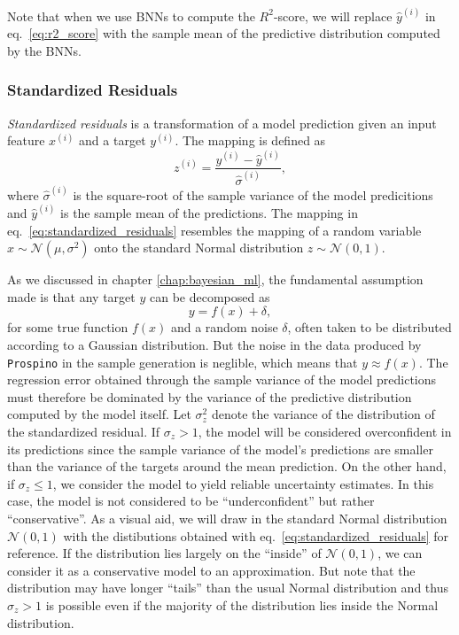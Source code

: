 Note that when we use BNNs to compute the $R^2$-score, we will replace $\hat{y}^{(i)}$ in eq.~\eqref{eq:r2_score} with the sample mean of the predictive distribution computed by the BNNs. 

\subsubsection{Standardized Residuals}
\textit{Standardized residuals} is a transformation of a model prediction given an input feature $x^{(i)}$ and a target $y^{(i)}$. The mapping is defined as
\begin{equation}\label{eq:standardized_residuals}
    z^{(i)} = \frac{y^{(i)} - \hat{y}^{(i)}}{\hat{\sigma}^{(i)}},
\end{equation}
where $\hat{\sigma}^{(i)}$ is the square-root of the sample variance of the model predicitions and $\hat{y}^{(i)}$ is the sample mean of the predictions. The mapping in eq.~\eqref{eq:standardized_residuals} resembles the mapping of a random variable $x \sim \mathcal{N}(\mu, \sigma^2)$ onto the standard Normal distribution $z \sim \mathcal{N}(0, 1)$.


As we discussed in chapter \ref{chap:bayesian_ml}, the fundamental assumption made is that any target $y$ can be decomposed as
\begin{equation}
    y = f(x) + \delta,
\end{equation}
for some true function $f(x)$ and a random noise $\delta$, often taken to be distributed according to a Gaussian distribution. But the noise in the data produced by \texttt{Prospino} in the sample generation is neglible, which means that $y \approx f(x)$. The regression error obtained through the sample variance of the model predictions must therefore be dominated by the variance of the predictive distribution computed by the model itself. Let $\sigma_z^2$ denote the variance of the distribution of the standardized residual. If $\sigma_z > 1$, the model will be considered overconfident in its predictions since the sample variance of the model's predictions are smaller than the variance of the targets around the mean prediction. On the other hand, if $\sigma_z \leq 1$, we consider the model to yield reliable uncertainty estimates. In this case, the model is not considered to be ``underconfident'' but rather ``conservative''. As a visual aid, we will draw in the standard Normal distribution $\mathcal{N}(0, 1)$ with the distibutions obtained with eq.~\eqref{eq:standardized_residuals} for reference. If the distribution lies largely on the ``inside'' of $\mathcal{N}(0, 1)$, we can consider it as a conservative model to an approximation. But note that the distribution may have longer ``tails'' than the usual Normal distribution and thus 
$\sigma_z > 1$ is possible even if the majority of the distribution lies inside the Normal distribution.
